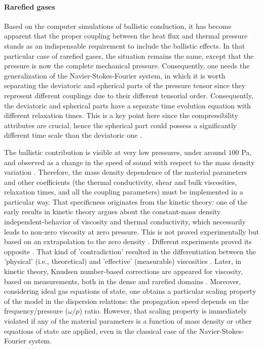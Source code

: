 \documentclass[sn-mathphys]{sn-jnl}%
\theoremstyle{thmstyleone}%
\theoremstyle{thmstyletwo}%
\theoremstyle{thmstylethree}%
\begin{document}
{\paragraph{Rarefied gases}
Based on the computer simulations of ballistic conduction, it has become apparent that the proper coupling between the heat flux and thermal pressure stands as an indispensable requirement to include the ballistic effects. In that particular case of rarefied gases, the situation remains the same, except that the pressure is now the complete mechanical pressure. Consequently, one needs the generalization of the Navier-Stokes-Fourier system, in which it is worth separating the deviatoric and spherical parts of the pressure tensor \cite{Meix43a, AriEtal12c, Arietal15, Arietal13, KovEta20a} since they represent different couplings due to their different tensorial order. Consequently, the deviatoric and spherical parts have a separate time evolution equation with different relaxation times. This is a key point here since the compressibility attributes are crucial, hence the spherical part could possess a significantly different time scale than the deviatoric one \cite{Arietal13, Kov18rg, Struc12, StrTah11, Struc04, StrucTorr08}.

The ballistic contribution is visible at very low pressures, under around $100$ Pa, and observed as a change in the speed of sound with respect to the mass density variation \cite{Rhod46, Gre56, MeySess57, SluiEtal64, SluiEtal65}. Therefore, the mass density dependence of the material parameters and other coefficients (the thermal conductivity, shear and bulk viscosities, relaxation times, and all the coupling parameters) must be implemented in a particular way. That specificness originates from the kinetic theory: one of the early results in kinetic theory argues about the constant-mass density independent-behavior of viscosity and thermal conductivity, which necessarily leads to non-zero viscosity at zero pressure. This is not proved experimentally but based on an extrapolation to the zero density \cite{GrackiEtal69a}. Different experiments proved its opposite \cite{IttPae40}. That kind of 'contradiction' resulted in the differentiation between the 'physical' (i.e., theoretical) and 'effective' (measurable) viscosities \cite{Kov18rg}. Later, in kinetic theory, Knudsen number-based corrections are appeared for viscosity, based on measurements, both in the dense and rarefied domains \cite{BesKar99, RooDar09}. Moreover, considering ideal gas equations of state, one obtains a particular scaling property of the model in the dispersion relations: the propagation speed depends on the frequency/pressure ($\omega/p$) ratio. However, that scaling property is immediately violated if any of the material parameters is a function of mass density or other equations of state are applied, even in the classical case of the Navier-Stokes-Fourier system.

}
\end{document}
